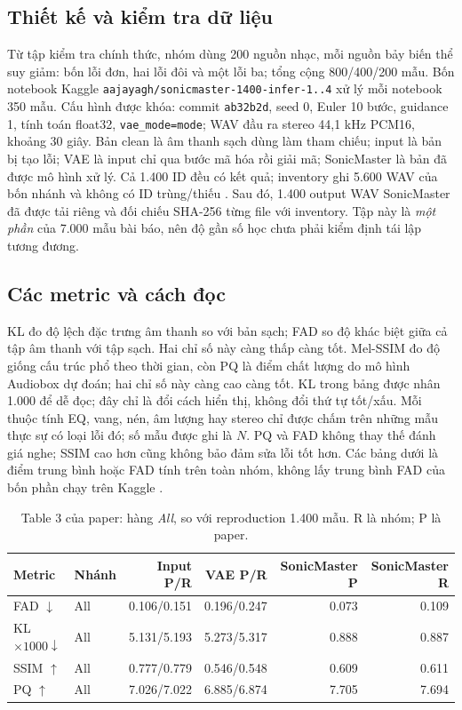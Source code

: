 \documentclass[10pt,a4paper]{article}
\begin{document}
\subsection{Thiết kế và kiểm tra dữ liệu}
Từ tập kiểm tra chính thức, nhóm dùng 200 nguồn nhạc, mỗi nguồn bảy biến thể suy giảm: bốn lỗi đơn, hai lỗi đôi và một lỗi ba; tổng cộng 800/400/200 mẫu. Bốn notebook Kaggle \texttt{aajayagh/sonicmaster-1400-infer-1..4} xử lý mỗi notebook 350 mẫu. Cấu hình được khóa: commit \texttt{ab32b2d}, seed 0, Euler 10 bước, guidance 1, tính toán float32, \texttt{vae\_mode=mode}; WAV đầu ra stereo 44,1 kHz PCM16, khoảng 30 giây. Bản clean là âm thanh sạch dùng làm tham chiếu; input là bản bị tạo lỗi; VAE là input chỉ qua bước mã hóa rồi giải mã; SonicMaster là bản đã được mô hình xử lý. Cả 1.400 ID đều có kết quả; inventory ghi 5.600 WAV của bốn nhánh và không có ID trùng/thiếu \cite{runreport}. Sau đó, 1.400 output WAV SonicMaster đã được tải riêng và đối chiếu SHA-256 từng file với inventory. Tập này là \emph{một phần} của 7.000 mẫu bài báo, nên độ gần số học chưa phải kiểm định tái lập tương đương.

\subsection{Các metric và cách đọc}
KL đo độ lệch đặc trưng âm thanh so với bản sạch; FAD so độ khác biệt giữa cả tập âm thanh với tập sạch. Hai chỉ số này càng thấp càng tốt. Mel-SSIM đo độ giống cấu trúc phổ theo thời gian, còn PQ là điểm chất lượng do mô hình Audiobox dự đoán; hai chỉ số này càng cao càng tốt. KL trong bảng được nhân 1.000 để dễ đọc; đây chỉ là đổi cách hiển thị, không đổi thứ tự tốt/xấu. Mỗi thuộc tính EQ, vang, nén, âm lượng hay stereo chỉ được chấm trên những mẫu thực sự có loại lỗi đó; số mẫu được ghi là $N$. PQ và FAD không thay thế đánh giá nghe; SSIM cao hơn cũng không bảo đảm sửa lỗi tốt hơn. Các bảng dưới là điểm trung bình hoặc FAD tính trên toàn nhóm, không lấy trung bình FAD của bốn phần chạy trên Kaggle \cite{tables,runreport}.

\begin{table}[ht]
\centering\small
\caption{Table 3 của paper: hàng \emph{All}, so với reproduction 1.400 mẫu. $\mathrm{R}$ là nhóm; $\mathrm{P}$ là paper.}
\begin{tabular}{llrrrr}
\toprule
Metric & Nhánh & Input P/R & VAE P/R & SonicMaster P & SonicMaster R\\
\midrule
FAD $\downarrow$ & All & 0.106/0.151 & 0.196/0.247 & 0.073 & 0.109\\
KL$\times1000\downarrow$ & All & 5.131/5.193 & 5.273/5.317 & 0.888 & 0.887\\
SSIM $\uparrow$ & All & 0.777/0.779 & 0.546/0.548 & 0.609 & 0.611\\
PQ $\uparrow$ & All & 7.026/7.022 & 6.885/6.874 & 7.705 & 7.694\\
\bottomrule
\end{tabular}
\end{table}
\end{document}
